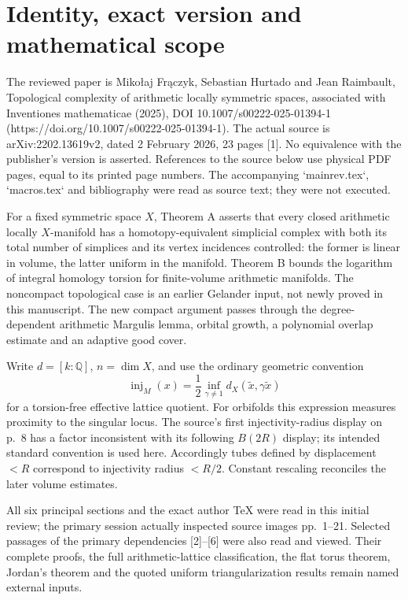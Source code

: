 \documentclass[10pt]{article}
\begin{document}
\section*{Identity, exact version and mathematical scope}
The reviewed paper is Mikołaj Frączyk, Sebastian Hurtado and Jean Raimbault, Topological complexity of arithmetic locally symmetric spaces, associated with Inventiones mathematicae (2025), DOI 10.1007/s00222-025-01394-1 (https://doi.org/10.1007/s00222-025-01394-1). The actual source is arXiv:2202.13619v2, dated 2 February 2026, 23 pages [1]. No equivalence with the publisher’s version is asserted. References to the source below use physical PDF pages, equal to its printed page numbers. The accompanying `mainrev.tex`, `macros.tex` and bibliography were read as source text; they were not executed.\par
For a fixed symmetric space \(X\), Theorem A asserts that every closed arithmetic locally \(X\)-manifold has a homotopy-equivalent simplicial complex with both its total number of simplices and its vertex incidences controlled: the former is linear in volume, the latter uniform in the manifold. Theorem B bounds the logarithm of integral homology torsion for finite-volume arithmetic manifolds. The noncompact topological case is an earlier Gelander input, not newly proved in this manuscript. The new compact argument passes through the degree-dependent arithmetic Margulis lemma, orbital growth, a polynomial overlap estimate and an adaptive good cover.\par
Write \(d=[k:\mathbb Q]\), \(n=\dim X\), and use the ordinary geometric convention \[\operatorname{inj}_M(x)=\frac12\inf_{\gamma\ne1}d_X(\widetilde x,\gamma\widetilde x)\] for a torsion-free effective lattice quotient. For orbifolds this expression measures proximity to the singular locus. The source’s first injectivity-radius display on p. 8 has a factor inconsistent with its following \(B(2R)\) display; its intended standard convention is used here. Accordingly tubes defined by displacement \(<R\) correspond to injectivity radius \(<R/2\). Constant rescaling reconciles the later volume estimates.\par
All six principal sections and the exact author TeX were read in this initial review; the primary session actually inspected source images pp. 1–21. Selected passages of the primary dependencies [2]–[6] were also read and viewed. Their complete proofs, the full arithmetic-lattice classification, the flat torus theorem, Jordan’s theorem and the quoted uniform triangularization results remain named external inputs.\par
\end{document}
